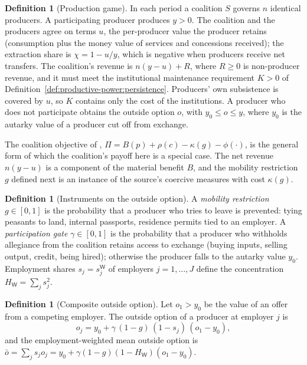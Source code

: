 \documentclass[11pt,letterpaper]{article}
\theoremstyle{definition}
\newtheorem{definition}[theorem]{Definition}
\theoremstyle{remark}
\newcommand{\pW}{\mathsf{W}}
\newcommand{\HW}{H_{\pW}}
\begin{document}
\begin{definition}[Production game]
\label{def:productive-power:game}
In each period a coalition $S$ governs $n$ identical producers. A participating producer produces $y>0$. The coalition and the producers agree on terms $u$, the per-producer value the producer retains (consumption plus the money value of services and concessions received); the extraction share is $\chi=1-u/y$, which is negative when producers receive net transfers. The coalition's revenue is $n(y-u)+R$, where $R\ge 0$ is non-producer revenue, and it must meet the institutional maintenance requirement $K>0$ of Definition~\ref{def:productive-power:persistence}. Producers' own subsistence is covered by $u$, so $K$ contains only the cost of the institutions. A producer who does not participate obtains the outside option $o$, with $y_0\le o\le y$, where $y_0$ is the autarky value of a producer cut off from exchange.
\end{definition}

The coalition objective of \citet{largo2026hbs}, $\Pi=B(p)+\rho(c)-\kappa(g)-\phi(\cdot)$, is the general form of which the coalition's payoff here is a special case. The net revenue $n(y-u)$ is a component of the material benefit $B$, and the mobility restriction $g$ defined next is an instance of the source's coercive measures with cost $\kappa(g)$.

\begin{definition}[Instruments on the outside option]
\label{def:productive-power:gate}
A \emph{mobility restriction} $g\in[0,1]$ is the probability that a producer who tries to leave is prevented: tying peasants to land, internal passports, residence permits tied to an employer. A \emph{participation gate} $\gamma\in[0,1]$ is the probability that a producer who withholds allegiance from the coalition retains access to exchange (buying inputs, selling output, credit, being hired); otherwise the producer falls to the autarky value $y_0$. Employment shares $s_j=s^{\pW}_j$ of employers $j=1,\dots,J$ define the concentration $\HW=\sum_j s_j^2$.
\end{definition}

\begin{definition}[Composite outside option]
\label{def:productive-power:outside}
Let $o_1>y_0$ be the value of an offer from a competing employer. The outside option of a producer at employer $j$ is
\[
o_j=y_0+\gamma\,(1-g)\,(1-s_j)\,(o_1-y_0),
\]
and the employment-weighted mean outside option is $\bar o=\sum_j s_jo_j=y_0+\gamma(1-g)(1-\HW)(o_1-y_0)$.
\end{definition}
\end{document}
